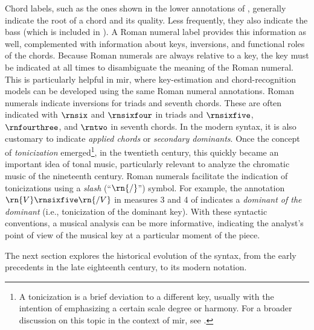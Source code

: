 

Chord labels, such as the ones shown in the lower
annotations of , generally indicate the root
of a chord and its quality. Less frequently, they also
indicate the bass (which is included in ). A
Roman numeral label provides this information as well,
complemented with information about keys, inversions, and
functional roles of the chords. Because Roman numerals are
always relative to a key, the key must be indicated at all
times to disambiguate the meaning of the Roman numeral. This
is particularly helpful in \gls{mir}, where key-estimation
and chord-recognition models can be developed using the same
Roman numeral annotations. Roman numerals indicate
inversions for triads and seventh chords. These are often
indicated with $\rnsix$ and $\rnsixfour$ in triads and
$\rnsixfive$, $\rnfourthree$, and $\rntwo$ in seventh
chords. In the modern syntax, it is also customary to
indicate \emph{applied chords} or \emph{secondary
dominants}. Once the concept of \emph{tonicization}
emerged\footnote{A tonicization is a brief deviation to a
different key, usually with the intention of emphasizing a
certain scale degree or harmony. For a broader discussion on
this topic in the context of \gls{mir}, see
\textcite{napoleslopez2020local}.}, in the twentieth
century, this quickly became an important idea of tonal
music, particularly relevant to analyze the chromatic music
of the nineteenth century. Roman numerals facilitate the
indication of tonicizations using a \emph{slash}
(``$\rn{/}$'') symbol. For example, the annotation
$\rn{V}\rnsixfive\rn{/V}$ in measures 3 and 4 of
 indicates a \emph{dominant of the dominant}
(i.e., tonicization of the dominant key). With these
syntactic conventions, a musical analysis can be more
informative, indicating the analyst's point of view of the
musical key at a particular moment of the piece.

The next section explores the historical evolution of the
syntax, from the early precedents in the late eighteenth
century, to its modern notation.

